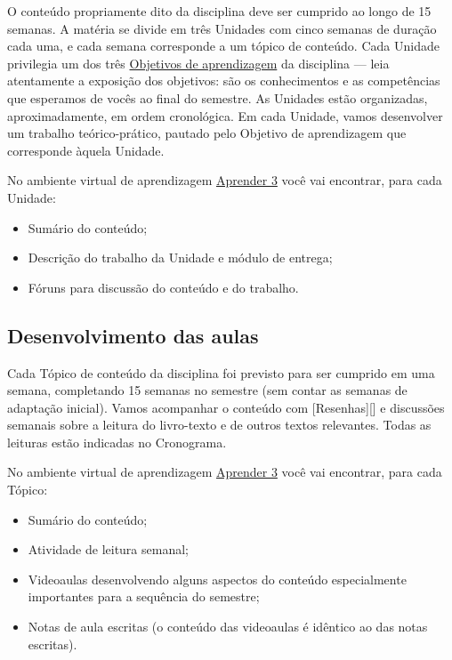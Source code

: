 \documentclass[
  11pt,
  brazil,
  a4paper,
]{article}
\providecommand{\tightlist}{%
  \setlength{\itemsep}{0pt}\setlength{\parskip}{0pt}}
\begin{document}
O conteúdo propriamente dito da disciplina deve ser cumprido ao longo de
15 semanas. A matéria se divide em três Unidades com cinco semanas de
duração cada uma, e cada semana corresponde a um tópico de conteúdo.
Cada Unidade privilegia um dos três
\href{plano.md\#objetivos-de-aprendizagem}{Objetivos de aprendizagem} da
disciplina --- leia atentamente a exposição dos objetivos: são os
conhecimentos e as competências que esperamos de vocês ao final do
semestre. As Unidades estão organizadas, aproximadamente, em ordem
cronológica. Em cada Unidade, vamos desenvolver um trabalho
teórico-prático, pautado pelo Objetivo de aprendizagem que corresponde
àquela Unidade.

No ambiente virtual de aprendizagem
\href{https://aprender3.unb.br/course/view.php?id=2766}{Aprender 3} você
vai encontrar, para cada Unidade:

\begin{itemize}
\tightlist
\item
  Sumário do conteúdo;
\item
  Descrição do trabalho da Unidade e módulo de entrega;
\item
  Fóruns para discussão do conteúdo e do trabalho.
\end{itemize}

\hypertarget{desenvolvimento-das-aulas}{%
\subsection{Desenvolvimento das aulas}\label{desenvolvimento-das-aulas}}

Cada Tópico de conteúdo da disciplina foi previsto para ser cumprido em
uma semana, completando 15 semanas no semestre (sem contar as semanas de
adaptação inicial). Vamos acompanhar o conteúdo com {[}Resenhas{]}{[}{]}
e discussões semanais sobre a leitura do livro-texto e de outros textos
relevantes. Todas as leituras estão indicadas no Cronograma.

No ambiente virtual de aprendizagem
\href{https://aprender3.unb.br/course/view.php?id=2766}{Aprender 3} você
vai encontrar, para cada Tópico:

\begin{itemize}
\tightlist
\item
  Sumário do conteúdo;
\item
  Atividade de leitura semanal;
\item
  Videoaulas desenvolvendo alguns aspectos do conteúdo especialmente
  importantes para a sequência do semestre;
\item
  Notas de aula escritas (o conteúdo das videoaulas é idêntico ao das
  notas escritas).
\end{itemize}
\end{document}
